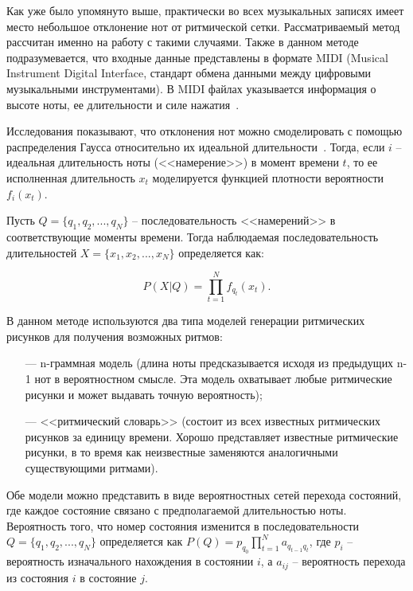 Как уже было упомянуто выше, практически во всех музыкальных записях имеет место небольшое отклонение нот от ритмической сетки. Рассматриваемый метод рассчитан именно на работу с такими случаями. Также в данном методе подразумевается, что входные данные представлены в формате MIDI (Musical Instrument Digital Interface, стандарт обмена данными между цифровыми музыкальными инструментами). В MIDI файлах указывается информация о высоте ноты, ее длительности и силе нажатия~\cite{midi}.

Исследования показывают, что отклонения нот можно смоделировать с помощью распределения Гаусса относительно их идеальной длительности~\cite{hmm}. Тогда, если $i$ -- идеальная длительность ноты (<<намерение>>) в момент времени $t$, то ее исполненная длительность $x_t$ моделируется функцией плотности вероятности $f_i(x_t)$.

Пусть $Q = \{q_1, q_2, ..., q_N\}$ -- последовательность <<намерений>> в соответствующие моменты времени. Тогда наблюдаемая последовательность длительностей $X = \{x_1, x_2, ..., x_N\}$ определяется как:

\begin{equation}
	P(X|Q) = \prod_{t=1}^N f_{q_t}(x_t).
\end{equation}

В данном методе используются два типа моделей генерации ритмических рисунков для получения возможных ритмов:

\begin{itemize}
	\item[---] n-граммная модель (длина ноты предсказывается исходя из предыдущих n-1 нот в вероятностном смысле. Эта модель охватывает любые ритмические рисунки и может выдавать точную вероятность);
	\item[---] <<ритмический словарь>> (состоит из всех известных ритмических рисунков за единицу времени. Хорошо представляет известные ритмические рисунки, в то время как неизвестные заменяются аналогичными существующими ритмами).
\end{itemize}

Обе модели можно представить в виде вероятностных сетей перехода состояний, где каждое состояние связано с предполагаемой длительностью ноты. Вероятность того, что номер состояния изменится в последовательности $Q = \{q_1, q_2, ..., q_N\}$ определяется как $P(Q) = p_{q_0} \prod_{t=1}^N a_{q_{t-1}q_t}$, где $p_i$ -- вероятность изначального нахождения в состоянии $i$, а $a_{ij}$ -- вероятность перехода из состояния $i$ в состояние $j$.

